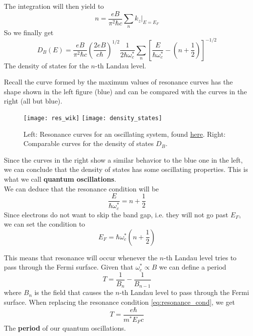 \documentclass{beamer}
\begin{document}
\begin{frame}
  The integration will then yield to 
  \begin{equation}
      n=\frac{eB}{\pi^2\hbar c}\sum_n k_z|_{E=E_F}
  \end{equation}
  So we finally get
  \begin{equation}
      D_B(E)=\frac{eB}{\pi^2\hbar c}\left(\frac{2eB}{c\hbar}\right)^{1/2}\frac{1}{2\hbar\omega_c^*}\sum_n\left[\frac{E}{\hbar\omega_c^*}-\left(n+\frac{1}{2}\right)\right]^{-1/2}
      \label{eq:d_states}
  \end{equation}
  The density of states for the $n$-th Landau level.
 \end{frame}
 
 \begin{frame}
   Recall the curve formed by the maximum values of resonance curves has the shape shown in the left figure (blue) and can be compared with the curves in the right (all but blue).
   \begin{figure}
       \centering
       \texttt{[image: res\_wik]}
       \texttt{[image: density\_states]}
        
       \caption{Left: Resonance curves for an oscillating system, found \underline{\href{https://en.wikipedia.org/wiki/Resonance#/media/File:Resonance.PNG}{here}}. Right: Comparable curves for the density of states $D_B$.}
       \label{fig:res_wik}
   \end{figure}
 \end{frame}
 
 \begin{frame}
    Since the curves in the right show a similar behavior to the blue one in the left, we can conclude that the density of states has some oscillating properties. This is what we call \textbf{quantum oscillations}.\\
    We can deduce that the resonance condition will be 
    \begin{equation}
        \frac{E}{\hbar\omega_c^*}=n+\frac{1}{2}
    \end{equation}
    Since electrons do not want to skip the band gap, i.e. they will not go past $E_F$, we can set the condition to
    \begin{equation}
        E_F=\hbar\omega_c^*\left(n+\frac{1}{2}\right)
        \label{eq:resonance_cond}
    \end{equation}
 \end{frame}
 \begin{frame}
   This means that resonance will occur whenever the $n$-th Landau level tries to pass through the Fermi surface. Given that $\omega_c^* \propto B$ we can define a period $$T=\frac{1}{B_n} - \frac{1}{B_{n-1}}$$where $B_n$ is the field that causes the $n$-th Landau level to pass through the Fermi surface. When replacing the resonance condition \ref{eq:resonance_cond}, we get
   \begin{equation}
       T=\frac{e\hbar}{m^*E_Fc}
       \label{eq:period_res}
   \end{equation}
   The \textbf{period} of our quantum oscillations.
 \end{frame}
\end{document}
